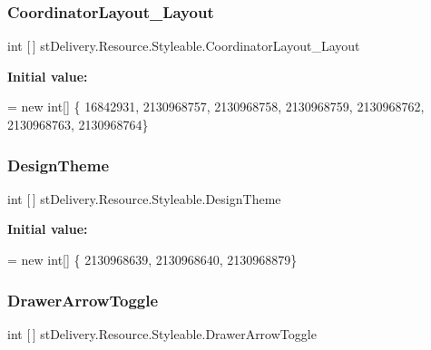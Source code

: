 \subsubsection{\texorpdfstring{Coordinator\+Layout\+\_\+\+Layout}{CoordinatorLayout\_Layout}}
{\footnotesize\ttfamily int \mbox{[}$\,$\mbox{]} st\+Delivery.\+Resource.\+Styleable.\+Coordinator\+Layout\+\_\+\+Layout\hspace{0.3cm}{\ttfamily [static]}}

{\bfseries Initial value\+:}
\begin{DoxyCode}
= \textcolor{keyword}{new} \textcolor{keywordtype}{int}[] \{
                    16842931,
                    2130968757,
                    2130968758,
                    2130968759,
                    2130968762,
                    2130968763,
                    2130968764\}
\end{DoxyCode}
\mbox{\label{classst_delivery_1_1_resource_1_1_styleable_a1fb7868118c35ae892eaae32bda7045b}} 
\subsubsection{\texorpdfstring{Design\+Theme}{DesignTheme}}
{\footnotesize\ttfamily int \mbox{[}$\,$\mbox{]} st\+Delivery.\+Resource.\+Styleable.\+Design\+Theme\hspace{0.3cm}{\ttfamily [static]}}

{\bfseries Initial value\+:}
\begin{DoxyCode}
= \textcolor{keyword}{new} \textcolor{keywordtype}{int}[] \{
                    2130968639,
                    2130968640,
                    2130968879\}
\end{DoxyCode}
\mbox{\label{classst_delivery_1_1_resource_1_1_styleable_a00cd4a96b3d1741c607ea653f9f442de}} 
\subsubsection{\texorpdfstring{Drawer\+Arrow\+Toggle}{DrawerArrowToggle}}
{\footnotesize\ttfamily int \mbox{[}$\,$\mbox{]} st\+Delivery.\+Resource.\+Styleable.\+Drawer\+Arrow\+Toggle\hspace{0.3cm}{\ttfamily [static]}}

